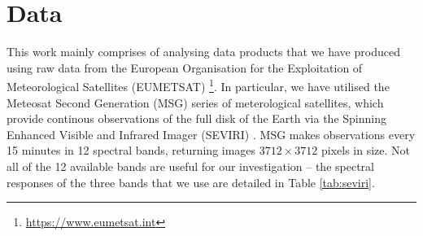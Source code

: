 \section{Data}
\begin{table}
  \centering
  \caption{Spectral characteristics of the three SEVIRI channels used
    in our work. Shown are the central, minimum and maximum
    wavelengths for the three spectral bands that we use.}
  \label{tab:seviri}
\end{table}

This work mainly comprises of analysing data products that we have
produced using raw data from the European Organisation for the
Exploitation of Meteorological Satellites
(EUMETSAT) \footnote{\url{https://www.eumetsat.int}}. In particular,
we have utilised the Meteosat Second Generation (MSG) series of
meterological satellites, which provide continous observations of the
full disk of the Earth via the Spinning Enhanced Visible and Infrared
Imager (SEVIRI) \citep{schmetz2002}. MSG makes observations every 15
minutes in 12 spectral bands, returning images $3712 \times 3712$ pixels in
size. Not all of the 12 available bands are useful for our
investigation -- the spectral responses of the three bands that we use
are detailed in Table \ref{tab:seviri}.

\begin{table}
  \centering
  \caption{The coordinates that define our regions of interest. North
    (East) and South (West) correspond to the most northern (eastern)
    and southern (western) lines of latitude (longitude),
    respectively. All values in decimal degrees.}
\end{table}


